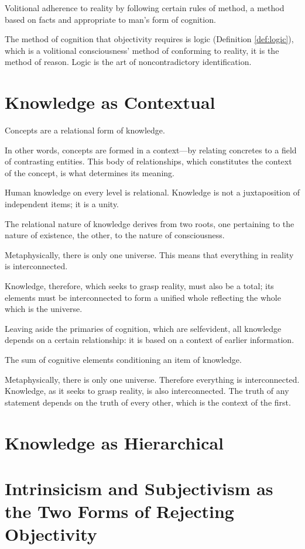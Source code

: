             \begin{definition}[Obectivity]
            \label{def:objectivity}
                Volitional adherence to reality by following certain rules of method, a method based on facts and appropriate to man's form of cognition.
            \end{definition}

        The method of cognition that objectivity requires is logic (Definition \ref{def:logic}), which is a volitional consciousness' method of conforming to reality, it is the method of reason. Logic is the art of noncontradictory identification.

    \section{Knowledge as Contextual}

        Concepts are a relational form of knowledge.

        In other words, concepts are formed in a context—by relating concretes to a field of contrasting entities. This body of relationships, which constitutes the context of the concept, is what determines its meaning.

        Human knowledge on every level is relational. Knowledge
        is not a juxtaposition of independent items; it is a unity.

        The relational nature of knowledge derives from two roots, one pertaining to the nature of existence, the other, to the nature of consciousness.

        Metaphysically, there is only one universe. This means that everything in reality is interconnected.

        Knowledge, therefore, which seeks to grasp reality, must also be a total; its elements must be interconnected to form a unified whole reflecting the whole which is the universe.

        Leaving aside the primaries of cognition, which are selfevident, all knowledge depends on a certain relationship: it is based on a context of earlier information.

        \begin{definition}[Context]
            \label{def:context}
                The sum of cognitive elements conditioning an item of knowledge.
        \end{definition}

        \begin{theorem}
            \label{the:context}
                Metaphysically, there is only one universe. Therefore everything is interconnected. Knowledge, as it seeks to grasp reality, is also interconnected. The truth of any statement depends on the truth of every other, which is the context of the first.
        \end{theorem}

    \section{Knowledge as Hierarchical}

    \section{Intrinsicism and Subjectivism as the Two Forms of Rejecting Objectivity}




